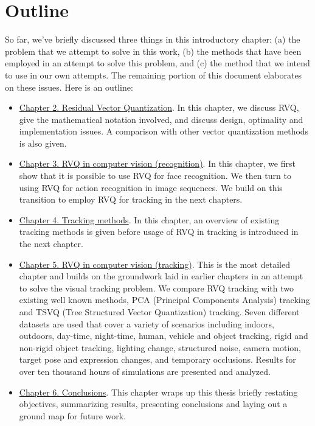 \section{Outline}
So far, we've briefly discussed three things in this introductory chapter: (a) the problem that we attempt to solve in this work, (b) the methods that have been employed in an attempt to solve this problem, and (c) the method that we intend to use in our own attempts.  The remaining portion of this document elaborates on these issues.  Here is an outline:

\begin{itemize}
\item \underline{Chapter 2.  Residual Vector Quantization}.  In this chapter, we discuss RVQ, give the mathematical notation involved, and discuss design, optimality and implementation issues.  A comparison with other vector quantization methods is also given.
\item \underline{Chapter 3.  RVQ in computer vision (recognition)}.  In this chapter, we first show that it is possible to use RVQ for face recognition.  We then turn to using RVQ for action recognition in image sequences.  We build on this transition to employ RVQ for tracking in the next chapters.
\item \underline{Chapter 4.  Tracking methods}.  In this chapter, an overview of existing tracking methods is given before usage of RVQ in tracking is introduced in the next chapter.
\item \underline{Chapter 5.  RVQ in computer vision (tracking)}.  This is the most detailed chapter and builds on the groundwork laid in earlier chapters in an attempt to solve the visual tracking problem.  We compare RVQ tracking with two existing well known methods, PCA (Principal Components Analysis) tracking and TSVQ (Tree Structured Vector Quantization) tracking.  Seven different datasets are used that cover a variety of scenarios including indoors, outdoors, day-time, night-time, human, vehicle and object tracking, rigid and non-rigid object tracking, lighting change, structured noise, camera motion, target pose and expression changes, and temporary occlusions.  Results for over ten thousand hours of simulations are presented and analyzed.
\item \underline{Chapter 6.  Conclusions}.  This chapter wraps up this thesis briefly restating objectives, summarizing results, presenting conclusions and laying out a ground map for future work.
\end{itemize}










